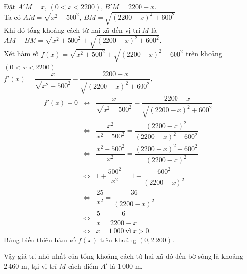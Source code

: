 \begin{ex}
{\begin{center}
		\end{center}
		Đặt $A'M=x$, $(0<x<2200)$,  $B'M=2200-x$.\\
		Ta có  $AM=\sqrt{x^2+500^2}$, $BM=\sqrt{(2200-x)^2+600^2}$.\\
		Khi đó tổng khoảng cách từ hai xã đến vị trí $M$ là $AM+BM= \sqrt{x^2+500^2}+\sqrt{(2200-x)^2+600^2} $.\\
		Xét hàm số $f(x)= \sqrt{x^2+500^2}+\sqrt{(2200-x)^2+600^2}$ trên khoảng $(0<x<2200)$.\\
		$f'(x)=\dfrac{x}{\sqrt{x^2+500^2}}-\dfrac{2200-x}{\sqrt{(2200-x)^2+600^2}}$,
		\allowdisplaybreaks
		\begin{eqnarray*}
			f'(x)=0&\Leftrightarrow&\dfrac{x}{\sqrt{x^2+500^2}}=\dfrac{2200-x}{\sqrt{(2200-x)^2+600^2}}
			\\
			&\Leftrightarrow&\dfrac{x^2}{x^2+500^2}=\dfrac{(2200-x)^2}{(2200-x)^2+600^2}\\
			&\Leftrightarrow&\dfrac{x^2+500^2}{x^2}=\dfrac{(2200-x)^2+600^2}{(2200-x)^2}\\
			&\Leftrightarrow& 1+\dfrac{500^2}{x^2}=1+\dfrac{600^2}{(2200-x)^2}
			\\
			&\Leftrightarrow& \dfrac{25}{x^2}=\dfrac{36}{(2200-x)^2}
			\\
			&\Leftrightarrow& \dfrac{5}{x}=\dfrac{6}{2200-x}
			\\
			&\Leftrightarrow& x=1\,000~ \text{vì}~  x>0.			
		\end{eqnarray*} 
		Bảng biến thiên hàm số $f(x)$ trên khoảng $( 0;2\,200)$.
		\begin{center}
		\end{center}
		Vậy giá trị nhỏ nhất của tổng khoảng cách từ hai xã đó đến bờ sông  là khoảng $2\,460$  m, tại vị trí $M$ cách điểm $A'$  là $1\,000$  m.
	}
\end{ex}

